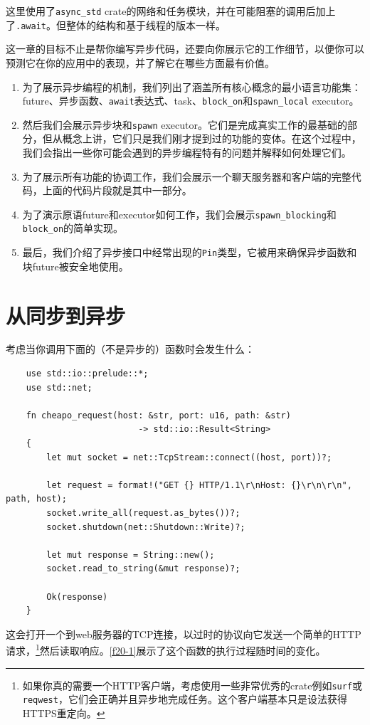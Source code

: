 这里使用了\texttt{async\_std} crate的网络和任务模块，并在可能阻塞的调用后加上了\texttt{.await}。但整体的结构和基于线程的版本一样。

这一章的目标不止是帮你编写异步代码，还要向你展示它的工作细节，以便你可以预测它在你的应用中的表现，并了解它在哪些方面最有价值。

\begin{enumerate}
    \item 为了展示异步编程的机制，我们列出了涵盖所有核心概念的最小语言功能集：future、异步函数、\texttt{await}表达式、task、\texttt{block\_on}和\texttt{spawn\_local} executor。
    \item 然后我们会展示异步块和\texttt{spawn} executor。它们是完成真实工作的最基础的部分，但从概念上讲，它们只是我们刚才提到过的功能的变体。在这个过程中，我们会指出一些你可能会遇到的异步编程特有的问题并解释如何处理它们。
    \item 为了展示所有功能的协调工作，我们会展示一个聊天服务器和客户端的完整代码，上面的代码片段就是其中一部分。
    \item 为了演示原语future和executor如何工作，我们会展示\texttt{spawn\_blocking}和\texttt{block\_on}的简单实现。
    \item 最后，我们介绍了异步接口中经常出现的\texttt{Pin}类型，它被用来确保异步函数和块future被安全地使用。
\end{enumerate}

\section{从同步到异步}

考虑当你调用下面的（不是异步的）函数时会发生什么：
\begin{verbatim}
    use std::io::prelude::*;
    use std::net;

    fn cheapo_request(host: &str, port: u16, path: &str)
                          -> std::io::Result<String>
    {
        let mut socket = net::TcpStream::connect((host, port))?;

        let request = format!("GET {} HTTP/1.1\r\nHost: {}\r\n\r\n", path, host);
        socket.write_all(request.as_bytes())?;
        socket.shutdown(net::Shutdown::Write)?;

        let mut response = String::new();
        socket.read_to_string(&mut response)?;

        Ok(response)
    }
\end{verbatim}

这会打开一个到web服务器的TCP连接，以过时的协议向它发送一个简单的HTTP请求，\footnote{如果你真的需要一个HTTP客户端，考虑使用一些非常优秀的crate例如\texttt{surf}或\texttt{reqwest}，它们会正确并且异步地完成任务。这个客户端基本只是设法获得HTTPS重定向。}然后读取响应。\autoref{f20-1}展示了这个函数的执行过程随时间的变化。

